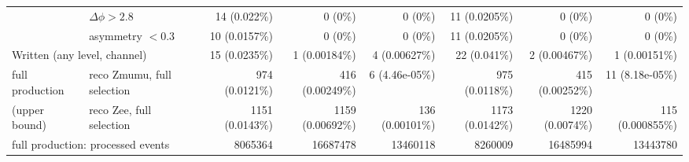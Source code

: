 \begin{tabular}{llrrrrrr}
 & $\Delta\phi > 2.8$ & 14 (0.022\%) & 0 (0\%) & 0 (0\%) & 11 (0.0205\%) & 0 (0\%) & 0 (0\%) \\
 & asymmetry $< 0.3$ & 10 (0.0157\%) & 0 (0\%) & 0 (0\%) & 11 (0.0205\%) & 0 (0\%) & 0 (0\%) \\
\midrule
\multicolumn{2}{l}{Written (any level, channel)} & 15 (0.0235\%) & 1 (0.00184\%) & 4 (0.00627\%) & 22 (0.041\%) & 2 (0.00467\%) & 1 (0.00151\%) \\
\midrule
full production & reco Zmumu, full selection & 974 (0.0121\%) & 416 (0.00249\%) & 6 (4.46e-05\%) & 975 (0.0118\%) & 415 (0.00252\%) & 11 (8.18e-05\%) \\
(upper bound) & reco Zee, full selection & 1151 (0.0143\%) & 1159 (0.00692\%) & 136 (0.00101\%) & 1173 (0.0142\%) & 1220 (0.0074\%) & 115 (0.000855\%) \\
\multicolumn{2}{l}{full production: processed events} & 8065364 & 16687478 & 13460118 & 8260009 & 16485994 & 13443780 \\
\bottomrule
\end{tabular}
